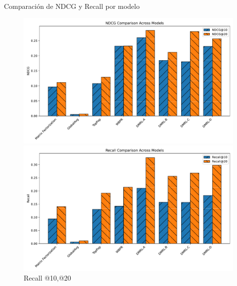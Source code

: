 \documentclass{beamer}
\begin{document}
\begin{frame}{Comparación de NDCG y Recall por modelo}
    \begin{figure}
        \centering
        \begin{minipage}{0.48\textwidth}
            \includegraphics[width=\textwidth]{images/ndcg_comparison.pdf}
            \caption*{NDCG @10,@20}
        \end{minipage}
        \hfill
        \begin{minipage}{0.48\textwidth}
            \includegraphics[width=\textwidth]{images/recall_comparison.pdf}
            \caption*{Recall @10,@20}
        \end{minipage}
    \end{figure}
\end{frame}
\end{document}
